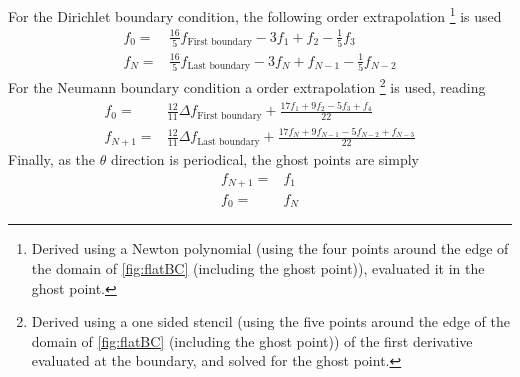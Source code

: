 For the Dirichlet boundary condition, the following  order extrapolation %
%
\footnote{
    Derived using a Newton polynomial (using the four points around the edge of the domain of \cref{fig:flatBC} (including the ghost point)), evaluated it in the ghost point.
}%
is used
%
\begin{align*}
      f_{0} =& \frac{16}{5}f_{\text{First boundary}}
              - 3          f_1
              +            f_2
              - \frac{1}{5}f_3
    \\
      f_{N} =& \frac{16}{5}f_{\text{Last boundary}}
              - 3          f_{N}
              +            f_{N-1}
              - \frac{1}{5}f_{N-2}
\end{align*}
%
For the Neumann boundary condition a  order extrapolation %
%
\footnote{
    Derived using a one sided stencil (using the five points around the edge of the domain of \cref{fig:flatBC} (including the ghost point)) of the first derivative evaluated at the boundary, and solved for the ghost point.
}%
%
is used, reading
%
\begin{align*}
      f_0 =& \frac{12}{11}\Delta f_{\text{First boundary}}
                +
                \frac{
                  17f_1
                +  9f_2
                -  5f_3
                +   f_4
               }{22}
    \\
      f_{N+1} =& \frac{12}{11}\Delta f_{\text{Last boundary}}
                +
                \frac{
                  17f_{N}
                +  9f_{N-1}
                -  5f_{N-2}
                +   f_{N-3}
               }{22}
\end{align*}
%
Finally, as the $\theta$ direction is periodical, the ghost points are simply
%
\begin{align*}
    f_{N+1} =& f_{1}
    \\
    f_{0} =& f_{N}
\end{align*}
